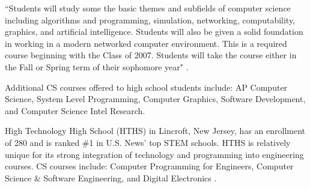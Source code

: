 \begin{blockquote}``Students will study some the basic themes and subfields of computer science including algorithms and programming, simulation, networking, computability, graphics, and artificial intelligence. Students will also be given a solid foundation in working in a modern networked computer environment. This is a required course beginning with the Class of 2007. Students will take the course either in the Fall or Spring term of their sophomore year" \cite{stuy}.
\end{blockquote} 
Additional CS courses offered to high school students include: AP Computer Science, System Level Programming, Computer Graphics, Software Development, and Computer Science Intel Research. \par

High Technology High School (HTHS) in Lincroft, New Jersey, has an enrollment of 280 and is ranked \#1 in U.S. News' top STEM schools. HTHS is relatively unique for its strong integration of technology and programming into engineering courses. CS courses include: Computer Programming for Engineers, Computer Science \& Software Engineering, and Digital Electronics \cite{hths}. \par

